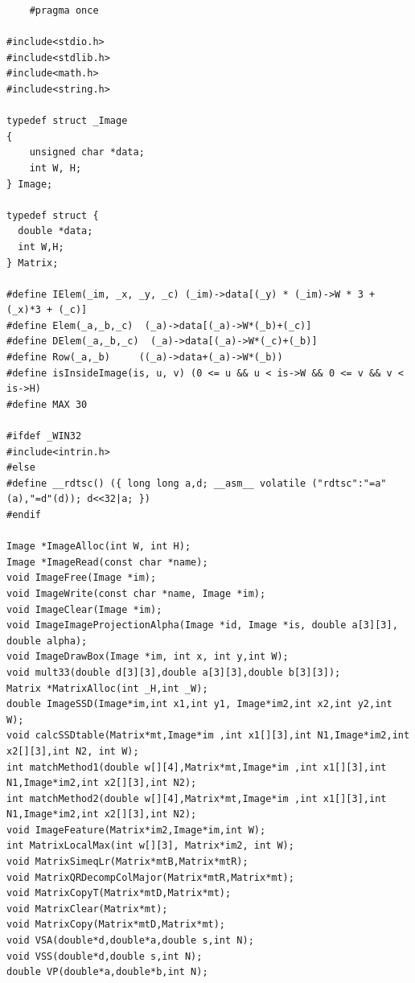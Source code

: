 \documentclass[11pt]{jarticle}
\begin{document}
\begin{verbatim}
    #pragma once

#include<stdio.h>
#include<stdlib.h>
#include<math.h>
#include<string.h>

typedef struct _Image
{
    unsigned char *data;
    int W, H;
} Image;

typedef struct {
  double *data;
  int W,H;
} Matrix;

#define IElem(_im, _x, _y, _c) (_im)->data[(_y) * (_im)->W * 3 + (_x)*3 + (_c)]
#define Elem(_a,_b,_c)  (_a)->data[(_a)->W*(_b)+(_c)]
#define DElem(_a,_b,_c)  (_a)->data[(_a)->W*(_c)+(_b)]
#define Row(_a,_b)     ((_a)->data+(_a)->W*(_b))
#define isInsideImage(is, u, v) (0 <= u && u < is->W && 0 <= v && v < is->H)
#define MAX 30

#ifdef _WIN32
#include<intrin.h>
#else
#define __rdtsc() ({ long long a,d; __asm__ volatile ("rdtsc":"=a"(a),"=d"(d)); d<<32|a; })
#endif

Image *ImageAlloc(int W, int H);
Image *ImageRead(const char *name);
void ImageFree(Image *im);
void ImageWrite(const char *name, Image *im);
void ImageClear(Image *im);
void ImageImageProjectionAlpha(Image *id, Image *is, double a[3][3], double alpha);
void ImageDrawBox(Image *im, int x, int y,int W);
void mult33(double d[3][3],double a[3][3],double b[3][3]);
Matrix *MatrixAlloc(int _H,int _W);
double ImageSSD(Image*im,int x1,int y1, Image*im2,int x2,int y2,int W);
void calcSSDtable(Matrix*mt,Image*im ,int x1[][3],int N1,Image*im2,int x2[][3],int N2, int W);
int matchMethod1(double w[][4],Matrix*mt,Image*im ,int x1[][3],int N1,Image*im2,int x2[][3],int N2);
int matchMethod2(double w[][4],Matrix*mt,Image*im ,int x1[][3],int N1,Image*im2,int x2[][3],int N2);
void ImageFeature(Matrix*im2,Image*im,int W);
int MatrixLocalMax(int w[][3], Matrix*im2, int W);
void MatrixSimeqLr(Matrix*mtB,Matrix*mtR);
void MatrixQRDecompColMajor(Matrix*mtR,Matrix*mt);
void MatrixCopyT(Matrix*mtD,Matrix*mt);
void MatrixClear(Matrix*mt);
void MatrixCopy(Matrix*mtD,Matrix*mt);
void VSA(double*d,double*a,double s,int N);
void VSS(double*d,double s,int N);
double VP(double*a,double*b,int N);
\end{verbatim}
\end{document}
